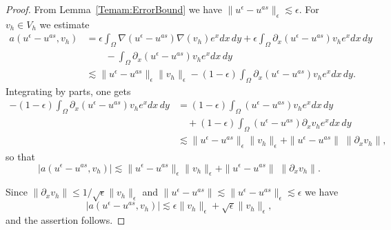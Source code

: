 \documentclass{article}
\newcommand{\ueps}{u^\epsilon}
\newcommand{\uas}{u^{as}}
\newcommand{\intO}{\int_\Omega}
\begin{document}
\begin{proof}
From Lemma~\ref{Temam:ErrorBound} we have 
$
\|\ueps - \uas\|_\epsilon \lesssim \epsilon.
$
For $v_h \in V_h$ we estimate
\begin{equation*}
  \begin{aligned}
   a(\ueps - \uas,v_h) 
    &= \epsilon\intO \nabla (\ueps - \uas)\nabla (v_h) e^x dx\,dy 
          + \epsilon\intO \partial_x(\ueps - \uas)v_h e^x dx\,dy \\ 
     &\qquad  -\intO \partial_x(\ueps - \uas)v_h e^x dx\,dy \\
      &\lesssim \|\ueps - \uas\|_\epsilon \|v_h\|_\epsilon  -(1-\epsilon)\intO \partial_x(\ueps - \uas) v_h e^x dx\,dy.
  \end{aligned}
\end{equation*}
Integrating by parts, one gets
\begin{equation*}
  \begin{aligned}
       -(1-\epsilon)\intO \partial_x(\ueps - \uas)v_h e^x dx\,dy 
      &= (1-\epsilon)\intO (\ueps - \uas)v_h e^x dx\,dy \\
      & \quad+ (1-\epsilon)\intO (\ueps - \uas) \partial_x v_h e^x dx\,dy \\
   & \lesssim\|\ueps -\uas\|_\epsilon\|v_h\|_\epsilon + \|\ueps-\uas\|\;\|\partial_x v_h\|,
  \end{aligned}
\end{equation*}
so that 
\[ | a(\ueps - \uas,v_h) |
      \lesssim \|\ueps - \uas\|_\epsilon \|v_h\|_\epsilon  +\|\ueps-\uas\|\;\|\partial_x v_h\|.
      \]
      
Since $\|\partial_x v_h\| \le 1/\sqrt{\epsilon} \|v_h\|_\epsilon $ and $\|\ueps - \uas\| \lesssim \|\ueps - \uas\|_\epsilon \lesssim \epsilon$ we have
\begin{equation*}
   |a(\ueps - \uas,v_h) |
 \lesssim \epsilon \|v_h\|_\epsilon +  \sqrt{\epsilon}\|v_h\|_\epsilon,
\end{equation*}
and the assertion follows.
\end{proof}
\end{document}
